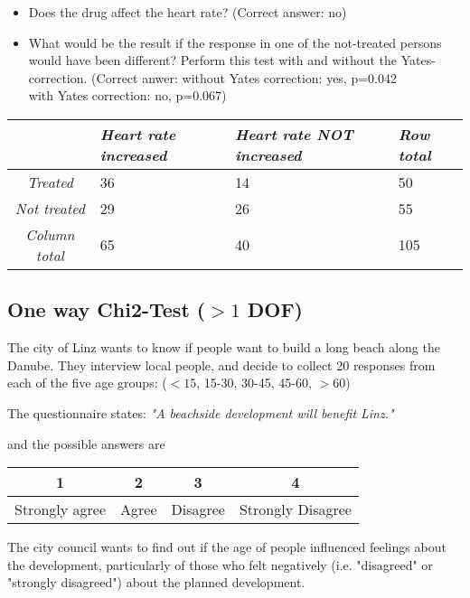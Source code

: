 \begin{itemize}
  \item     Does the drug affect the heart rate?
    (Correct answer: no)

  \item     What would be the result if the response in one of the not-treated persons would have been different? Perform this test with and without the Yates-correction.
      (Correct anwer:
        without Yates correction: yes, p=0.042\\
        with Yates correction: no, p=0.067)

\end{itemize}

\begin{table}[h]
  \centering
  \begin{tabular}{|c|l l | l|}
  \hline
  & \emph{Heart rate increased} & \emph{Heart rate NOT increased} & \emph{Row total} \\
  \hline
  \emph{Treated} & 36 & 14 & 50 \\
  \emph{Not treated} & 29 & 26 & 55 \\
  \hline
  \emph{Column total} & 65 & 40 & 105 \\
  \hline
  \end{tabular}
\end{table}


\subsection{One way Chi2-Test ($>1$ DOF)}

The city of Linz wants to know if people want to build a long beach along the Danube. They interview local people, and decide to collect 20 responses from each of the five age groups: ($<15$, 15-30, 30-45, 45-60, $>60$)

The questionnaire states: \emph{"A beachside development will benefit Linz."}

and the possible answers are

\begin{table}[h]
    \centering
    \begin{tabular}{c|c|c|c}
      1 & 2 & 3 & 4 \\
      \hline
      Strongly agree & Agree & Disagree & Strongly Disagree \\
    \end{tabular}
\end{table}

The city council wants to find out if the age of people influenced feelings about the development, particularly of those who felt negatively (i.e. "disagreed" or "strongly disagreed") about the planned development.

